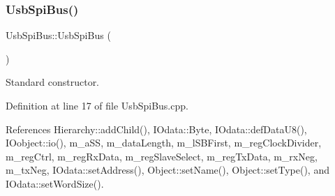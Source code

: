 \subsubsection{\texorpdfstring{Usb\+Spi\+Bus()}{UsbSpiBus()}}
{\footnotesize\ttfamily Usb\+Spi\+Bus\+::\+Usb\+Spi\+Bus (\begin{DoxyParamCaption}{ }\end{DoxyParamCaption})}



Standard constructor. 



Definition at line 17 of file Usb\+Spi\+Bus.\+cpp.



References Hierarchy\+::add\+Child(), I\+Odata\+::\+Byte, I\+Odata\+::def\+Data\+U8(), I\+Oobject\+::io(), m\+\_\+a\+SS, m\+\_\+data\+Length, m\+\_\+l\+S\+B\+First, m\+\_\+reg\+Clock\+Divider, m\+\_\+reg\+Ctrl, m\+\_\+reg\+Rx\+Data, m\+\_\+reg\+Slave\+Select, m\+\_\+reg\+Tx\+Data, m\+\_\+rx\+Neg, m\+\_\+tx\+Neg, I\+Odata\+::set\+Address(), Object\+::set\+Name(), Object\+::set\+Type(), and I\+Odata\+::set\+Word\+Size().


